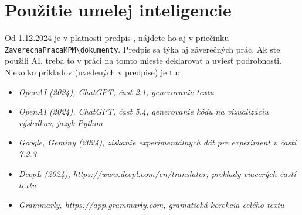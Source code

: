 \chapter*{Použitie umelej inteligencie}

Od 1.12.2024 je v platnosti predpis , nájdete ho aj v priečinku \verb|ZaverecnaPracaMPM\dokumenty|. Predpis sa týka aj záverečných prác. Ak ste použili AI, treba to v práci na tomto mieste deklarovať a uviesť podrobnosti. Niekoľko príkladov (uvedených v predpise) je tu:

\begin{itemize}
	\item \textit{OpenAI (2024), ChatGPT, časť 2.1, generovanie textu}
	
	\item \textit{OpenAI (2024), ChatGPT, časť 5.4, generovanie kódu na vizualizáciu výsledkov, jazyk Python}
	
	\item \textit{Google, Geminy (2024), získanie experimentálnych dát pre experiment v časti 7.2.3}
	
	\item \textit{DeepL (2024), https://www.deepl.com/en/translator, preklady viacerých častí textu}
	
	\item \textit{Grammarly, https://app.grammarly.com, gramatická korekcia celého textu}
\end{itemize}
	